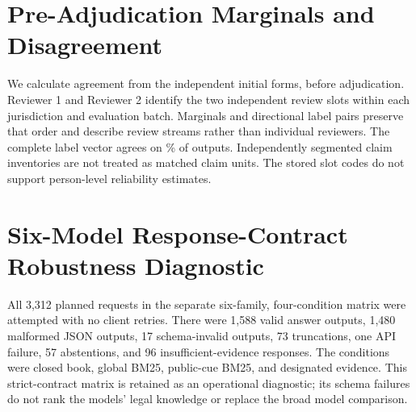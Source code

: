 \documentclass[11pt]{article}
\DeclareRobustCommand{\claim}[2]{#2}
\begin{document}
\section{Pre-Adjudication Marginals and Disagreement}
\claim{RELIABILITY}{We calculate agreement from the independent initial forms, before adjudication. Reviewer 1 and Reviewer 2 identify the two independent review slots within each jurisdiction and evaluation batch. Marginals and directional label pairs preserve that order and describe review streams rather than individual reviewers. The complete label vector agrees on \RAgreeAll\% of outputs. Independently segmented claim inventories are not treated as matched claim units. The stored slot codes do not support person-level reliability estimates.}
\begin{table}[tp]
\centering\small

\caption{\claim{CAPMARGINALS}{Pre-adjudication class marginals, preserving the original two review slots. Correctness and fidelity units are outputs; atom units are individual required-atom labels.}}
\end{table}
\begin{table}[tp]
\centering\small

\caption{\claim{CAPDIRECTION}{Directional pre-adjudication label pairs, including agreement cells. Released adjudication labels are not counted as additional agreement observations.}}
\end{table}

\section{Six-Model Response-Contract Robustness Diagnostic}
\label{app:operational}
\claim{APPROBUST}{All 3,312 planned requests in the separate six-family, four-condition matrix were attempted with no client retries. There were 1,588 valid answer outputs, 1,480 malformed JSON outputs, 17 schema-invalid outputs, 73 truncations, one API failure, 57 abstentions, and 96 insufficient-evidence responses. The conditions were closed book, global BM25, public-cue BM25, and designated evidence. This strict-contract matrix is retained as an operational diagnostic; its schema failures do not rank the models' legal knowledge or replace the broad model comparison.}
\begin{table}[tp]
\centering\small\setlength{\tabcolsep}{4pt}

\caption{\claim{CAPSTATUS}{Operational breadth only. A--D count valid answer outputs out of 138 planned calls per arm. Remaining columns count disjoint non-answer statuses across all arms: malformed JSON, schema invalidity, truncation, API failure, and combined abstention/insufficient evidence. These are response-contract outcomes, not legal-ability scores.}}
\end{table}
\end{document}
